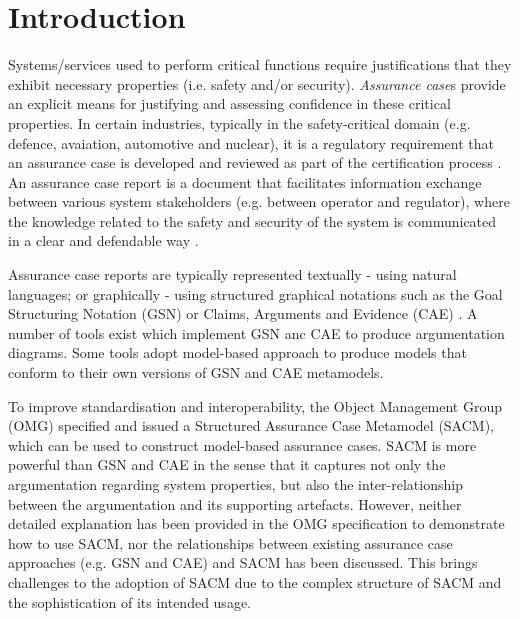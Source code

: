 \section{Introduction}
Systems/services used to perform critical functions require justifications that they exhibit necessary properties (i.e. safety and/or security). \textit{Assurance case}s provide an explicit means for justifying and assessing confidence in these critical properties. In certain industries, typically in the safety-critical domain (e.g. defence, avaiation, automotive and nuclear), it is a regulatory requirement that an assurance case is developed and reviewed as part of the certification process \cite{healthFound}.
An assurance case report is a document that facilitates information exchange between various system stakeholders (e.g. between operator and regulator), where the knowledge related to the safety and security of the system is communicated in a clear and defendable way \cite{hawkins2013assurance}. 

Assurance case reports are typically represented textually - using natural languages; or graphically - using structured graphical notations such as the Goal Structuring Notation (GSN) \cite{kelly2004goal} or Claims, Arguments and Evidence (CAE) \cite{cae}. A number of tools exist which implement GSN anc CAE to produce argumentation diagrams. Some tools adopt model-based approach to produce models that conform to their own versions of GSN and CAE metamodels. 

To improve standardisation and interoperability, the Object Management Group (OMG) specified and issued a Structured Assurance Case Metamodel (SACM), which can be used to construct model-based assurance cases. 
SACM is more powerful than GSN and CAE in the sense that it captures not only the argumentation regarding system properties, but also the inter-relationship between the argumentation and its supporting artefacts. However, neither detailed explanation has been provided in the OMG specification to demonstrate how to use SACM, nor the relationships between existing assurance case approaches (e.g. GSN and CAE) and SACM has been discussed. This brings challenges to the adoption of SACM due to the complex structure of SACM and the sophistication of its intended usage. 

